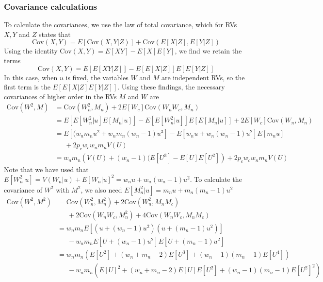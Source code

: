 \documentclass{article}
\newcommand{\igjindent}{\,\,\,\,\,\,\,\,\,}
\begin{document}
\begin{appendices}
\subsubsection{Covariance calculations}
To calculate the covariances, we use the law of total covariance, which for RVs $X,Y$ and $Z$ states that
\begin{equation*}
    \mathrm{Cov}(X,Y)=E[\mathrm{Cov}(X,Y|Z)]+\mathrm{Cov}(E[X|Z],E[Y|Z])
\end{equation*}
Using the identity $\mathrm{Cov}(X,Y)=E[XY]-E[X]E[Y]$, we find we retain the terms
\begin{equation*}
    \mathrm{Cov}(X,Y)=E[E[XY|Z]]-E[E[X|Z]]E[E[Y|Z]]
\end{equation*}
In this case, when $u$ is fixed, the variables $W$ and $M$ are independent RVs, so the first term is the $E[E[X|Z]E[Y|Z]]$. Using these findings, the necessary covariances of higher order in the RVs $M$ and $W$ are
\begin{equation}
    \begin{split}
    \mathrm{Cov}(W^2,M)&=\mathrm{Cov}(W_n^2,M_n)+
            2E[W_c]\mathrm{Cov}(W_nW_c,M_n)\\
        &=E[E[W_n^2|u]E[M_n|u]]-E[E[W_n^2|u]]E[E[M_n|u]]+2E[W_c]\mathrm{Cov}(W_n,M_n)\\
        &=E[(w_nm_nu^2+w_nm_n(w_n-1)u^3]-E[w_nu+w_n(w_n-1)u^2]E[m_nu]\\
        &\igjindent +2p_cw_cw_nm_nV(U)\\
        &=w_nm_n\left(V(U)+(w_n-1)(E[U^3]-E[U]E[U^2]\right)+2p_cw_cw_nm_nV(U)
    \end{split}
\end{equation}
Note that we have used that $E[W_n^2|u]=V(W_n|u)+E[W_n|u]^2=w_nu+w_n(w_n-1)u^2$. To calculate the covariance of $W^2$ with $M^2$, we also need $E[M_n^2|u]=m_nu+m_n(m_n-1)u^2$
\begin{equation}
    \begin{split}
    \mathrm{Cov}(W^2,M^2)&=\mathrm{Cov}(W_n^2,M_n^2)+
            2\mathrm{Cov}(W_n^2,M_nM_c)\\
            &\igjindent +2\mathrm{Cov}(W_nW_c,M_n^2)
             +4\mathrm{Cov}(W_nW_c,M_nM_c)\\
    &=w_nm_nE[(u+(w_n-1)u^2)(u+(m_n-1)u^2)]\\
    &\igjindent -w_nm_nE[U+(w_n-1)u^2]E[U+(m_n-1)u^2]\\
    &=w_nm_n(E[U^2]+(w_n+m_n-2)E[U^3]+(w_n-1)(m_n-1)E[U^4])\\
    &\igjindent -w_nm_n(E[U]^2+(w_n+m_n-2)E[U]E[U^2]+(w_n-1)(m_n-1)E[U^2]^2)\\

\end{split}
\end{equation}
\end{appendices}
\end{document}
